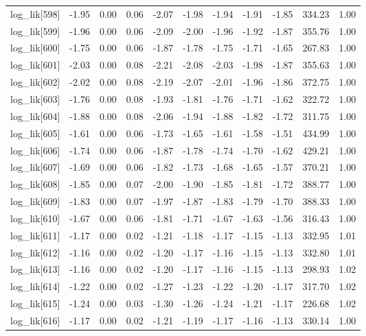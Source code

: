 \begin{table}[ht]
\begin{tabular}{rrrrrrrrrrr}
  log\_lik[598] & -1.95 & 0.00 & 0.06 & -2.07 & -1.98 & -1.94 & -1.91 & -1.85 & 334.23 & 1.00 \\ 
  log\_lik[599] & -1.96 & 0.00 & 0.06 & -2.09 & -2.00 & -1.96 & -1.92 & -1.87 & 355.76 & 1.00 \\ 
  log\_lik[600] & -1.75 & 0.00 & 0.06 & -1.87 & -1.78 & -1.75 & -1.71 & -1.65 & 267.83 & 1.00 \\ 
  log\_lik[601] & -2.03 & 0.00 & 0.08 & -2.21 & -2.08 & -2.03 & -1.98 & -1.87 & 355.63 & 1.00 \\ 
  log\_lik[602] & -2.02 & 0.00 & 0.08 & -2.19 & -2.07 & -2.01 & -1.96 & -1.86 & 372.75 & 1.00 \\ 
  log\_lik[603] & -1.76 & 0.00 & 0.08 & -1.93 & -1.81 & -1.76 & -1.71 & -1.62 & 322.72 & 1.00 \\ 
  log\_lik[604] & -1.88 & 0.00 & 0.08 & -2.06 & -1.94 & -1.88 & -1.82 & -1.72 & 311.75 & 1.00 \\ 
  log\_lik[605] & -1.61 & 0.00 & 0.06 & -1.73 & -1.65 & -1.61 & -1.58 & -1.51 & 434.99 & 1.00 \\ 
  log\_lik[606] & -1.74 & 0.00 & 0.06 & -1.87 & -1.78 & -1.74 & -1.70 & -1.62 & 429.21 & 1.00 \\ 
  log\_lik[607] & -1.69 & 0.00 & 0.06 & -1.82 & -1.73 & -1.68 & -1.65 & -1.57 & 370.21 & 1.00 \\ 
  log\_lik[608] & -1.85 & 0.00 & 0.07 & -2.00 & -1.90 & -1.85 & -1.81 & -1.72 & 388.77 & 1.00 \\ 
  log\_lik[609] & -1.83 & 0.00 & 0.07 & -1.97 & -1.87 & -1.83 & -1.79 & -1.70 & 388.33 & 1.00 \\ 
  log\_lik[610] & -1.67 & 0.00 & 0.06 & -1.81 & -1.71 & -1.67 & -1.63 & -1.56 & 316.43 & 1.00 \\ 
  log\_lik[611] & -1.17 & 0.00 & 0.02 & -1.21 & -1.18 & -1.17 & -1.15 & -1.13 & 332.95 & 1.01 \\ 
  log\_lik[612] & -1.16 & 0.00 & 0.02 & -1.20 & -1.17 & -1.16 & -1.15 & -1.13 & 332.80 & 1.01 \\ 
  log\_lik[613] & -1.16 & 0.00 & 0.02 & -1.20 & -1.17 & -1.16 & -1.15 & -1.13 & 298.93 & 1.02 \\ 
  log\_lik[614] & -1.22 & 0.00 & 0.02 & -1.27 & -1.23 & -1.22 & -1.20 & -1.17 & 317.70 & 1.02 \\ 
  log\_lik[615] & -1.24 & 0.00 & 0.03 & -1.30 & -1.26 & -1.24 & -1.21 & -1.17 & 226.68 & 1.02 \\ 
  log\_lik[616] & -1.17 & 0.00 & 0.02 & -1.21 & -1.19 & -1.17 & -1.16 & -1.13 & 330.14 & 1.00 \\ 

\end{tabular}
\end{table}
